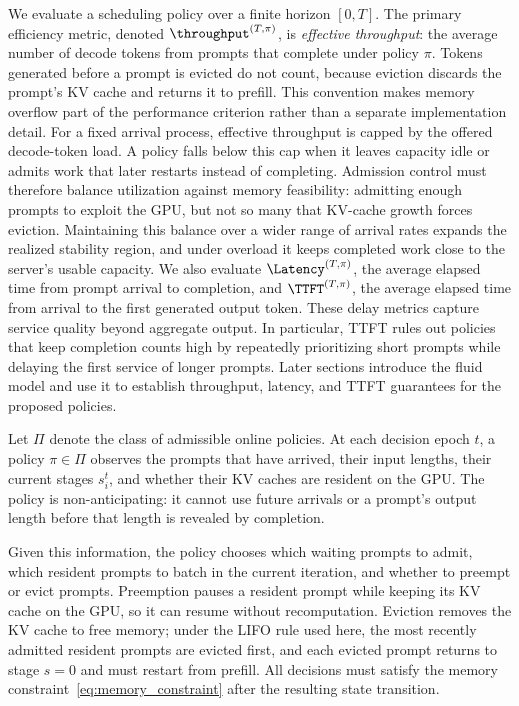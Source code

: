 We evaluate a scheduling policy over a finite horizon \([0,T]\). The primary efficiency metric, denoted \(\throughput^{(T,\pi)}\), is \textit{effective throughput}: the average number of decode tokens from prompts that complete under policy \(\pi\). Tokens generated before a prompt is evicted do not count, because eviction discards the prompt's KV cache and returns it to prefill. This convention makes memory overflow part of the performance criterion rather than a separate implementation detail. For a fixed arrival process, effective throughput is capped by the offered decode-token load. A policy falls below this cap when it leaves capacity idle or admits work that later restarts instead of completing. Admission control must therefore balance utilization against memory feasibility: admitting enough prompts to exploit the GPU, but not so many that KV-cache growth forces eviction. Maintaining this balance over a wider range of arrival rates expands the realized stability region, and under overload it keeps completed work close to the server's usable capacity. We also evaluate \(\Latency^{(T,\pi)}\), the average elapsed time from prompt arrival to completion, and \(\TTFT^{(T,\pi)}\), the average elapsed time from arrival to the first generated output token. These delay metrics capture service quality beyond aggregate output. In particular, TTFT rules out policies that keep completion counts high by repeatedly prioritizing short prompts while delaying the first service of longer prompts. Later sections introduce the fluid model and use it to establish throughput, latency, and TTFT guarantees for the proposed policies.

Let \(\Pi\) denote the class of admissible online policies. At each decision epoch \(t\), a policy \(\pi \in \Pi\) observes the prompts that have arrived, their input lengths, their current stages \(s_i^t\), and whether their KV caches are resident on the GPU. The policy is non-anticipating: it cannot use future arrivals or a prompt's output length before that length is revealed by completion.

Given this information, the policy chooses which waiting prompts to admit, which resident prompts to batch in the current iteration, and whether to preempt or evict prompts. Preemption pauses a resident prompt while keeping its KV cache on the GPU, so it can resume without recomputation. Eviction removes the KV cache to free memory; under the LIFO rule used here, the most recently admitted resident prompts are evicted first, and each evicted prompt returns to stage \(s=0\) and must restart from prefill. All decisions must satisfy the memory constraint~\eqref{eq:memory_constraint} after the resulting state transition.

